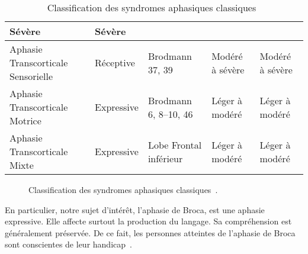 \begin{table}[ht]
\begin{adjustbox}{max width=15cm}
\begin{tabular}{|p{3cm}|p{3cm}|p{3cm}|p{3cm}|p{3cm}|}
        Sévère                                                  &
        Sévère                                                  \\
        \hline
        Aphasie Transcorticale Sensorielle                      &
        Réceptive                                               &
        Brodmann 37, 39                                         &
        Modéré à sévère                                         &
        Modéré à sévère                                         \\
        \hline
        Aphasie Transcorticale Motrice                          &
        Expressive                                              &
        Brodmann 6, 8--10, 46                                   &
        Léger à modéré                                          &
        Léger à modéré                                          \\
        \hline
        Aphasie Transcorticale Mixte                            &
        Expressive                                              &
        Lobe Frontal inférieur                                  &
        Léger à modéré                                          &
        Léger à modéré                                          \\
        \hline
        \end{tabular}
    \end{adjustbox}
    \caption[Classification des syndromes aphasiques classiques.]%
    {Classification des syndromes aphasiques classiques~\cite{Hallowell_2017}}
    \label{tab.aphasia-classification}
\end{table}
\begin{figure}[htb]
    \begin{center}
        \resizebox{\textwidth}{!}{}
    \end{center}
    \caption[Classification des syndromes aphasiques classiques.]
    {Classification des syndromes aphasiques classiques~\cite{Sreedharan_2018}.}
    \label{fig.aphasia-tree}
\end{figure}
En particulier, notre sujet d'intérêt, l'aphasie de Broca, est une aphasie expressive.
Elle affecte surtout la production du langage.
Sa compréhension est généralement préservée.
De ce fait, les personnes atteintes de l'aphasie de Broca sont conscientes de leur handicap~\cite{Chapey_2008}.
